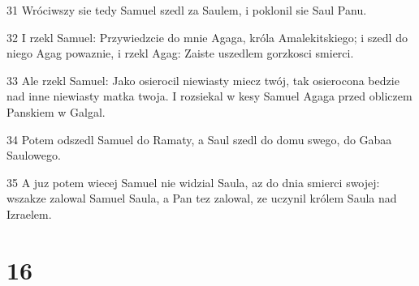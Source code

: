\par 31 Wróciwszy sie tedy Samuel szedl za Saulem, i poklonil sie Saul Panu.
\par 32 I rzekl Samuel: Przywiedzcie do mnie Agaga, króla Amalekitskiego; i szedl do niego Agag powaznie, i rzekl Agag: Zaiste uszedlem gorzkosci smierci.
\par 33 Ale rzekl Samuel: Jako osierocil niewiasty miecz twój, tak osierocona bedzie nad inne niewiasty matka twoja. I rozsiekal w kesy Samuel Agaga przed obliczem Panskiem w Galgal.
\par 34 Potem odszedl Samuel do Ramaty, a Saul szedl do domu swego, do Gabaa Saulowego.
\par 35 A juz potem wiecej Samuel nie widzial Saula, az do dnia smierci swojej: wszakze zalowal Samuel Saula, a Pan tez zalowal, ze uczynil królem Saula nad Izraelem.

\chapter{16}

